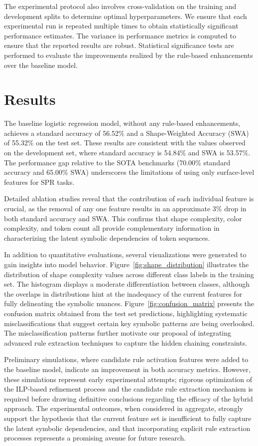 \documentclass{article}
\begin{document}
The experimental protocol also involves cross-validation on the training and development splits to determine optimal hyperparameters. We ensure that each experimental run is repeated multiple times to obtain statistically significant performance estimates. The variance in performance metrics is computed to ensure that the reported results are robust. Statistical significance tests are performed to evaluate the improvements realized by the rule-based enhancements over the baseline model.

\section{Results}
The baseline logistic regression model, without any rule-based enhancements, achieves a standard accuracy of 56.52\% and a Shape-Weighted Accuracy (SWA) of 55.32\% on the test set. These results are consistent with the values observed on the development set, where standard accuracy is 54.84\% and SWA is 53.57\%. The performance gap relative to the SOTA benchmarks (70.00\% standard accuracy and 65.00\% SWA) underscores the limitations of using only surface-level features for SPR tasks.

Detailed ablation studies reveal that the contribution of each individual feature is crucial, as the removal of any one feature results in an approximate 3\% drop in both standard accuracy and SWA. This confirms that shape complexity, color complexity, and token count all provide complementary information in characterizing the latent symbolic dependencies of token sequences.

In addition to quantitative evaluations, several visualizations were generated to gain insights into model behavior. Figure~\ref{fig:shape_distribution} illustrates the distribution of shape complexity values across different class labels in the training set. The histogram displays a moderate differentiation between classes, although the overlaps in distributions hint at the inadequacy of the current features for fully delineating the symbolic nuances. Figure~\ref{fig:confusion_matrix} presents the confusion matrix obtained from the test set predictions, highlighting systematic misclassifications that suggest certain key symbolic patterns are being overlooked. The misclassification patterns further motivate our proposal of integrating advanced rule extraction techniques to capture the hidden chaining constraints.

Preliminary simulations, where candidate rule activation features were added to the baseline model, indicate an improvement in both accuracy metrics. However, these simulations represent early experimental attempts; rigorous optimization of the ILP-based refinement process and the candidate rule extraction mechanism is required before drawing definitive conclusions regarding the efficacy of the hybrid approach. The experimental outcomes, when considered in aggregate, strongly support the hypothesis that the current feature set is insufficient to fully capture the latent symbolic dependencies, and that incorporating explicit rule extraction processes represents a promising avenue for future research.
\end{document}
